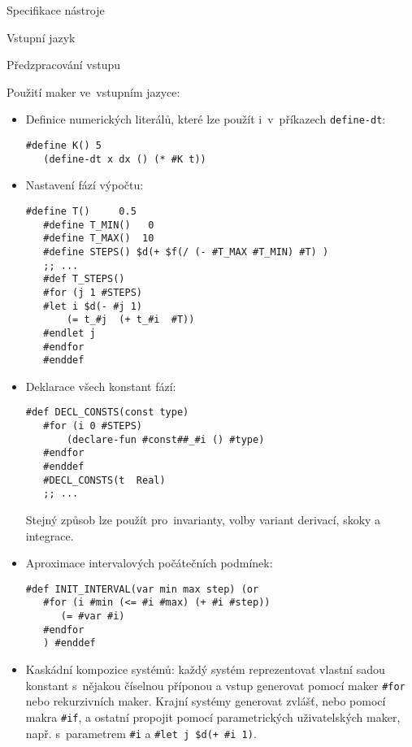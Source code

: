 \documentclass[thesis=M,czech]{FITthesis}[2012/06/26]
\newcommand{\id}[1]{\texttt{#1}}
\begin{document}
\begin{section}{Specifikace nástroje}
\begin{subsection}{Vstupní jazyk}
\begin{subsubsection}{Předzpracování vstupu}

\clearpage

\begin{paragraph}{Použití maker ve~vstupním jazyce:}
\label{p:design:spec:ilang:macros:usage}
\begin{itemize}
\item Definice numerických literálů,
   které lze použít i~v~příkazech \id{define\--dt}:
   \begin{Verbatim}[samepage=true]
   #define K() 5
   (define-dt x dx () (* #K t))
   \end{Verbatim}
\item Nastavení fází výpočtu:
   \begin{Verbatim}[samepage=true]
   #define T()     0.5
   #define T_MIN()   0
   #define T_MAX()  10
   #define STEPS() $d(+ $f(/ (- #T_MAX #T_MIN) #T) )
   ;; ...
   #def T_STEPS()
   #for (j 1 #STEPS)
   #let i $d(- #j 1)
       (= t_#j  (+ t_#i  #T))
   #endlet j
   #endfor
   #enddef
   \end{Verbatim}
\item Deklarace všech konstant fází:
   \begin{Verbatim}[samepage=true]
   #def DECL_CONSTS(const type)
   #for (i 0 #STEPS)
       (declare-fun #const##_#i () #type)
   #endfor
   #enddef
   #DECL_CONSTS(t  Real)
   ;; ...
   \end{Verbatim}
   Stejný způsob lze použít pro~invarianty,
   volby variant derivací, skoky a integrace.
\item Aproximace intervalových počátečních podmínek:
   \begin{Verbatim}[samepage=true]
   #def INIT_INTERVAL(var min max step) (or
   #for (i #min (<= #i #max) (+ #i #step))
      (= #var #i)
   #endfor
   ) #enddef
   \end{Verbatim}
\item Kaskádní kompozice systémů:
   každý systém reprezentovat vlastní sadou konstant
   s~nějakou číselnou příponou
   a vstup generovat pomocí maker \id{\#for}
   nebo rekurzivních maker.
   Krajní systémy generovat zvlášť,
   nebo pomocí makra \id{\#if},
   a ostatní propojit pomocí parametrických uživatelských maker,
   např. s~parametrem \id{\#i} a \id{\#let j \$d(+ \#i 1)}.
\end{itemize}
\end{paragraph} %


\end{subsubsection} %


\end{subsection}
\end{section}
\end{document}
